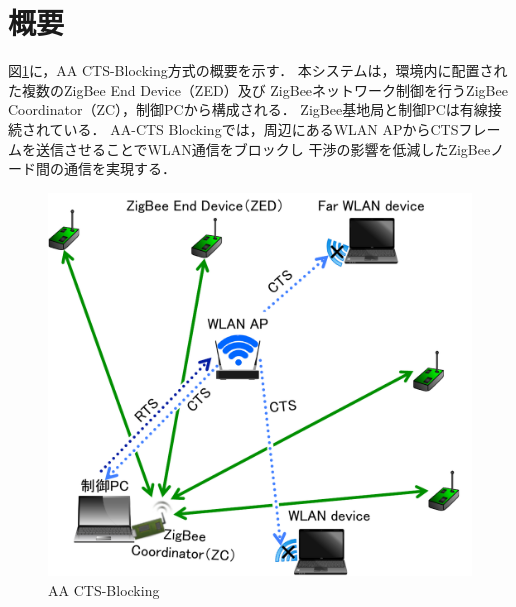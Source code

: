 \documentclass[12pt]{jreport}
\begin{document}
\section{概要}
\label{sec:outline}

図\ref{fig:aa_cts_blocking}に，AA CTS-Blocking方式の概要を示す．
本システムは，環境内に配置された複数のZigBee End Device（ZED）及び
ZigBeeネットワーク制御を行うZigBee Coordinator（ZC），制御PCから構成される．
ZigBee基地局と制御PCは有線接続されている．
AA-CTS Blockingでは，周辺にあるWLAN APからCTSフレームを送信させることでWLAN通信をブロックし
干渉の影響を低減したZigBeeノード間の通信を実現する．


\begin{figure}[bt]
 \centering
 \includegraphics[width=\columnwidth]{figure/aa_cts_blocking.pdf}
 \caption{AA CTS-Blocking}
 \label{fig:aa_cts_blocking}
\end{figure}
\end{document}
